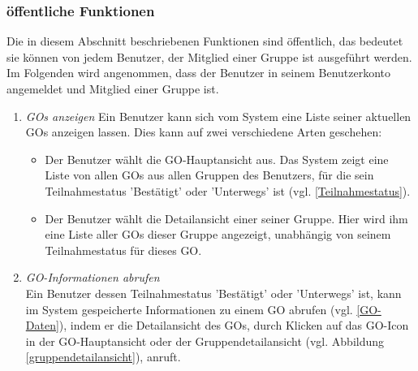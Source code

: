 \documentclass[parskip=full]{scrartcl}
\def\threedigits#1{%
  \ifnum#1<100 0\fi
  \ifnum#1<10 0\fi
  \number#1}
\begin{document}
\subsubsection{öffentliche Funktionen}
Die in diesem Abschnitt beschriebenen Funktionen sind öffentlich, das bedeutet sie können von jedem Benutzer, der Mitglied einer Gruppe ist ausgeführt werden.
Im Folgenden wird angenommen, dass der Benutzer in seinem Benutzerkonto angemeldet und Mitglied einer Gruppe ist.

\begin{enumerate}[label={\textbf{/F\protect\threedigits{\theenumi}0/}}, leftmargin=*, resume]	

	\item \textit{GOs anzeigen}\label{GOs anzeigen} Ein Benutzer kann sich vom System eine Liste seiner aktuellen GOs anzeigen lassen. Dies kann auf \colorbox{shadecolor}{zwei} verschiedene Arten geschehen:
	\begin{itemize}
		\item \colorbox{shadecolor}{\parbox{0.85\textwidth}{Der Benutzer wählt die GO-Hauptansicht aus. Das System zeigt eine Liste von allen GOs aus allen Gruppen des Benutzers, für die sein Teilnahmestatus 'Bestätigt' oder 'Unterwegs' ist (vgl. \ref{Teilnahmestatus}).}}
		\item Der Benutzer wählt die Detailansicht einer seiner Gruppe. Hier wird ihm eine Liste aller GOs dieser Gruppe angezeigt, unabhängig von seinem Teilnahmestatus für dieses GO.
	\end{itemize}
	
	\item \textit{GO-Informationen abrufen}\label{GO-Informationen abrufen} \\
	Ein Benutzer dessen Teilnahmestatus 'Bestätigt' oder 'Unterwegs' ist, kann im System gespeicherte Informationen zu einem GO abrufen (vgl. \ref{GO-Daten}), indem er die Detailansicht des GOs, durch Klicken auf das GO-Icon \colorbox{shadecolor}{in der GO-Hauptansicht} oder der Gruppendetailansicht (vgl. Abbildung \ref{gruppendetailansicht}), anruft.


\end{enumerate}
\end{document}
